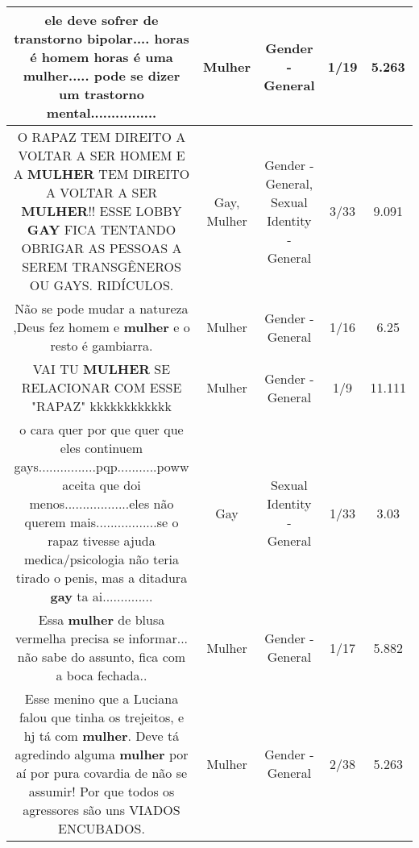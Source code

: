 \documentclass[11pt]{article}
\newlength\mylength
\begin{document}
\begin{center}
\begin{longtable}{|C{.65\mylength}|C{.30\mylength}|C{.12\mylength}|C{.12\mylength}|C{.12\mylength}|}
  \small ele deve sofrer de transtorno bipolar.... horas é homem horas é uma \textbf{mulher}..... pode se dizer um trastorno mental................\normalsize   & Mulher & Gender - General & 1/19 & 5.263 \\  \hline
  \small O RAPAZ TEM DIREITO A VOLTAR A SER HOMEM E A \textbf{MULHER} TEM DIREITO A VOLTAR A SER \textbf{MULHER}!! ESSE LOBBY \textbf{GAY} FICA TENTANDO OBRIGAR AS PESSOAS A SEREM TRANSGÊNEROS OU GAYS. RIDÍCULOS.\normalsize   & Gay, Mulher & Gender - General, Sexual Identity - General & 3/33 & 9.091 \\  \hline
  \small Não se pode mudar a natureza ,Deus fez homem e \textbf{mulher} e o resto é gambiarra.\normalsize   & Mulher & Gender - General & 1/16 & 6.25 \\  \hline
  \small VAI TU \textbf{MULHER} SE RELACIONAR COM ESSE "RAPAZ"  kkkkkkkkkkkk\normalsize   & Mulher & Gender - General & 1/9 & 11.111 \\  \hline
  \small o cara quer por que quer que eles continuem gays................pqp...........poww aceita que doi menos..................eles não querem mais.................se o rapaz tivesse ajuda medica/psicologia não teria tirado o penis, mas a ditadura \textbf{gay} ta ai..............\normalsize   & Gay & Sexual Identity - General & 1/33 & 3.03 \\  \hline
  \small Essa \textbf{mulher} de blusa vermelha precisa se informar... não sabe do assunto, fica com a boca fechada..\normalsize   & Mulher & Gender - General & 1/17 & 5.882 \\  \hline
  \small Esse menino que a Luciana falou que tinha os trejeitos, e hj tá com \textbf{mulher}. Deve tá agredindo alguma \textbf{mulher} por aí por pura covardia de não se assumir!  Por que todos os agressores são uns VIADOS ENCUBADOS.\normalsize   & Mulher & Gender - General & 2/38 & 5.263 \\  \hline

\end{longtable}
\end{center}
\end{document}
